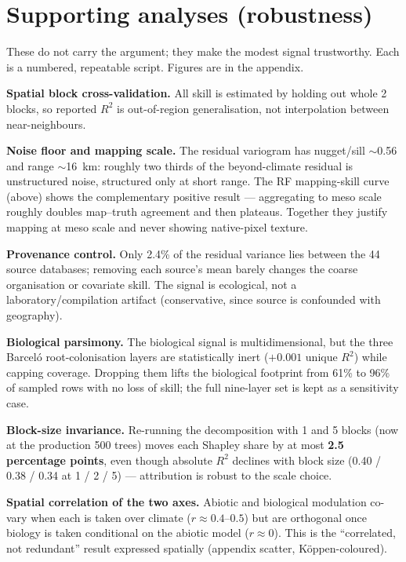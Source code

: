 \documentclass[11pt]{article}
\begin{document}
\section{Supporting analyses (robustness)}

These do not carry the argument; they make the modest signal trustworthy. Each is a
numbered, repeatable script. Figures are in the appendix.

\textbf{Spatial block cross-validation.} All skill is estimated by holding out whole
2\textdegree{} blocks, so reported $R^2$ is out-of-region generalisation, not
interpolation between near-neighbours.

\textbf{Noise floor and mapping scale.} The residual variogram has nugget/sill
$\sim$0.56 and range $\sim$16~km: roughly two thirds of the beyond-climate residual
is unstructured noise, structured only at short range. The RF mapping-skill curve
(above) shows the complementary positive result --- aggregating to meso scale
roughly doubles map--truth agreement and then plateaus. Together they justify mapping
at meso scale and never showing native-pixel texture.

\textbf{Provenance control.} Only 2.4\% of the residual variance lies between the 44
source databases; removing each source's mean barely changes the coarse organisation
or covariate skill. The signal is ecological, not a laboratory/compilation artifact
(conservative, since source is confounded with geography).

\textbf{Biological parsimony.} The biological signal is multidimensional, but the
three Barcel\'o root-colonisation layers are statistically inert ($+0.001$ unique
$R^2$) while capping coverage. Dropping them lifts the biological footprint from 61\%
to 96\% of sampled rows with no loss of skill; the full nine-layer set is kept as a
sensitivity case.

\textbf{Block-size invariance.} Re-running the decomposition with 1\textdegree{} and
5\textdegree{} blocks (now at the production 500 trees) moves each Shapley share by
at most \textbf{2.5 percentage points}, even though absolute $R^2$ declines with
block size (0.40 / 0.38 / 0.34 at 1 / 2 / 5\textdegree) --- attribution is robust to
the scale choice.

\textbf{Spatial correlation of the two axes.} Abiotic and biological modulation
co-vary when each is taken over climate ($r\approx0.4$--$0.5$) but are orthogonal once
biology is taken conditional on the abiotic model ($r\approx0$). This is the
``correlated, not redundant'' result expressed spatially (appendix scatter,
K\"oppen-coloured).
\end{document}

